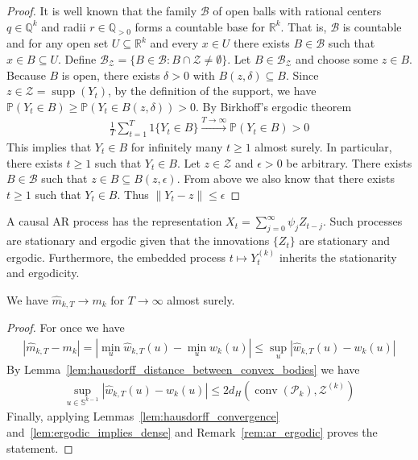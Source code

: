 \begin{proof}
    It is well known that the family $\mathcal{B}$ of open balls with rational centers $q\in\mathbb{Q}^{k}$ and radii $r\in\mathbb{Q}_{>0}$ forms a countable base for $\mathbb{R}^{k}$. That is, $\mathcal{B}$ is countable and for any open set $U\subseteq\mathbb{R}^k$ and every $x\in U$ there exists $B\in\mathcal{B}$ such that $x\in B\subseteq U$. Define $\mathcal{B}_{\mathcal{Z}}=\{B\in\mathcal{B}:B\cap\mathcal{Z}\ne\emptyset\}$. Let $B\in\mathcal{B}_{\mathcal{Z}}$ and choose some $z\in B$. Because $B$ is open, there exists $\delta>0$ with $B(z,\delta)\subseteq B$. Since $z\in\mathcal{Z}=\operatorname{supp}(Y_t)$, by the definition of the support, we have $\mathbb{P}(Y_t\in B)\ge\mathbb{P}(Y_t\in B(z,\delta))>0$. By Birkhoff's ergodic theorem
    \begin{align*}
        \frac{1}{T}\sum_{t=1}^{T}1\{Y_t\in B\}\stackrel{T\to\infty}{\to}\mathbb{P}(Y_t\in B)>0
    \end{align*}
    This implies that $Y_t\in B$ for infinitely many $t\ge 1$ almost surely. In particular, there exists $t\ge1$ such that $Y_t\in B$. Let $z\in\mathcal{Z}$ and $\epsilon>0$ be arbitrary. There exists $B\in\mathcal{B}$ such that $z\in B\subseteq B(z,\epsilon)$. From above we also know that there exists $t\ge1$ such that $Y_t\in B$. Thus $\|Y_t-z\|\le\epsilon$
\end{proof}

\begin{Rem}\label{rem:ar_ergodic}
    A causal AR process has the representation $X_t=\sum_{j=0}^{\infty}\psi_jZ_{t-j}$. Such processes are stationary and ergodic given that the innovations $\{Z_t\}$ are stationary and ergodic. Furthermore, the embedded process $t\mapsto Y_t^{(k)}$ inherits the stationarity and ergodicity.
\end{Rem}

\begin{Cor}\label{cor:main}
    We have $\hat{m}_{k,T}\to m_k$ for $T\to\infty$ almost  surely.
\end{Cor}

\begin{proof}
    For once we have
    \begin{align*}
        |\hat{m}_{k,T}-m_k|=|\min_u\hat{w}_{k,T}(u)-\min_uw_k(u)|\le\sup_u|\hat{w}_{k,T}(u)-w_k(u)|
    \end{align*}
    By Lemma~\ref{lem:hausdorff_distance_between_convex_bodies} we have
    \begin{align*}
        \sup_{u\in\mathbb{S}^{k-1}}|\hat{w}_{k,T}(u)-w_k(u)|\le2d_H(\operatorname{conv}(\mathcal{P}_k),\mathcal{Z}^{(k)})
    \end{align*}
    Finally, applying Lemmas~\ref{lem:hausdorff_convergence} and~\ref{lem:ergodic_implies_dense} and Remark~\ref{rem:ar_ergodic} proves the statement.
\end{proof}

